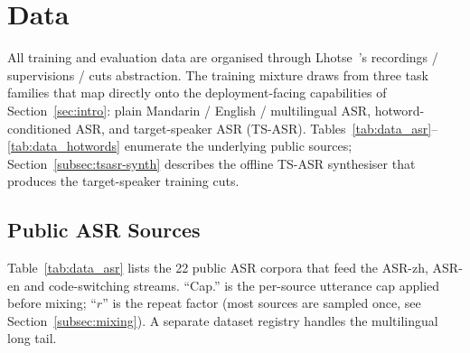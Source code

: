 \section{Data}
\label{sec:data}

All training and evaluation data are organised through
Lhotse~\cite{zelasko2021lhotse}'s recordings / supervisions / cuts
abstraction. The training mixture draws from three task families
that map directly onto the deployment-facing capabilities of
Section~\ref{sec:intro}: plain Mandarin / English / multilingual
ASR, hotword-conditioned ASR, and target-speaker ASR (TS-ASR).
Tables~\ref{tab:data_asr}--\ref{tab:data_hotwords} enumerate the
underlying public sources; Section~\ref{subsec:tsasr-synth}
describes the offline TS-ASR synthesiser that produces the
target-speaker training cuts.

\subsection{Public ASR Sources}
\label{subsec:asr-sources}

Table~\ref{tab:data_asr} lists the 22 public ASR corpora that feed
the ASR-zh, ASR-en and code-switching streams. ``Cap.'' is the
per-source utterance cap applied before mixing; ``$r$'' is the
repeat factor (most sources are sampled once, see
Section~\ref{subsec:mixing}). A separate dataset registry handles
the multilingual long tail.


